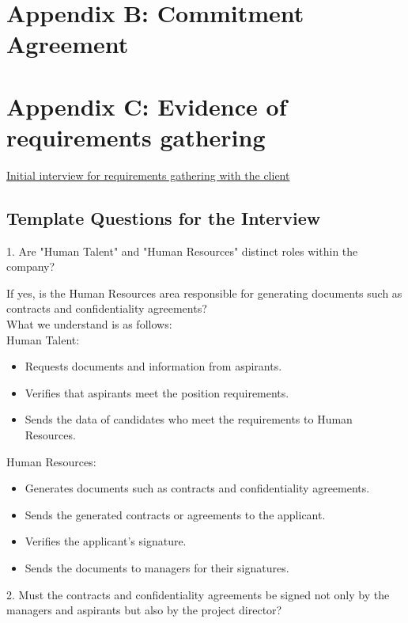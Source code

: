 \documentclass{scrreprt}
\begin{document}
\section{Appendix B: Commitment Agreement}
 
\FloatBarrier 

\section{Appendix C: Evidence of requirements gathering}
\href{https://drive.google.com/file/d/1h30RbdVEBx5Qlg8GVXav69ps1Y7cQVRv/view?usp=drive_link}{Initial interview for requirements gathering with the client}
\subsection*{Template Questions for the Interview}

1. Are "Human Talent" and "Human Resources" distinct roles within the company?

    If yes, is the Human Resources area responsible for generating documents such as contracts and confidentiality agreements?\\

    What we understand is as follows:\\
    Human Talent:
    \begin{itemize}
        \item Requests documents and information from aspirants.
        \item Verifies that aspirants meet the position requirements.
        \item Sends the data of candidates who meet the requirements to Human Resources.
    \end{itemize}
    Human Resources:
    \begin{itemize}
        \item Generates documents such as contracts and confidentiality agreements.
        \item Sends the generated contracts or agreements to the applicant.
        \item Verifies the applicant's signature.
        \item Sends the documents to managers for their signatures.
    \end{itemize}

2. Must the contracts and confidentiality agreements be signed not only by the managers and aspirants but also by the project director?\\
\end{document}
